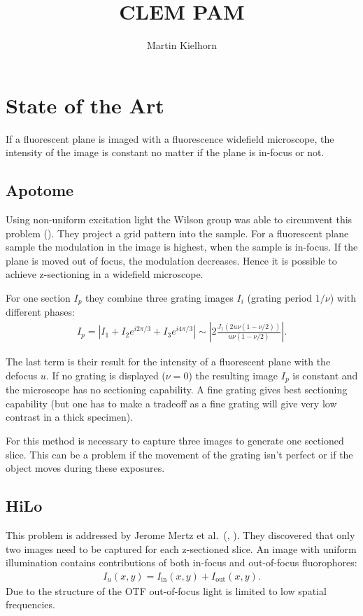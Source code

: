 \documentclass[11pt,abstracton,titlepage]{scrartcl}
\title{CLEM PAM}
\author{Martin Kielhorn}
\newcommand{\abs}[1]{\left| #1 \right|}
\begin{document}
\section{State of the Art}
If a fluorescent plane is imaged with a fluorescence widefield
microscope, the intensity of the image is constant no matter if the
plane is in-focus or not. 
\subsection{Apotome}
Using non-uniform excitation light the Wilson group was able to
circumvent this problem (\cite{1997Neil}). They project a grid pattern
into the sample. For a fluorescent plane sample the modulation in the
image is highest, when the sample is in-focus. If the plane is moved
out of focus, the modulation decreases. Hence it is possible to achieve
z-sectioning in a widefield microscope.

For one section $I_p$ they combine three grating images $I_i$ (grating
period $1/\nu$) with different phases:
\begin{align}
  I_p=\abs{I_1+I_2e^{i2\pi/3}+I_3e^{i4\pi/3}}
  \sim\abs{ 2 \frac{J_1(2u\nu(1-\nu/2))}{u\nu(1-\nu/2)}}.
\end{align}

The last term is their result for the intensity of a fluorescent plane
with the defocus $u$. If no grating is displayed ($\nu=0$) the
resulting image $I_p$ is constant and the microscope has no sectioning
capability. A fine grating gives best sectioning capability (but one
has to make a tradeoff as a fine grating will give very low contrast
in a thick specimen).

For this method is necessary to capture three images to generate one
sectioned slice. This can be a problem if the movement of the grating
isn't perfect or if the object moves during these exposures.

\subsection{HiLo}
This problem is addressed by Jerome Mertz et al.\ (\cite{2008Lim},
\cite{2009Santos}). They discovered that only two images need to be
captured for each z-sectioned slice.
An image with uniform illumination contains contributions
of both in-focus and out-of-focus fluorophores:
\begin{align}
  I_u(x,y)=I_\textrm{in}(x,y)+I_\textrm{out}(x,y).
\end{align}
Due to the structure of the OTF out-of-focus light is limited to low
spatial frequencies.
\end{document}
